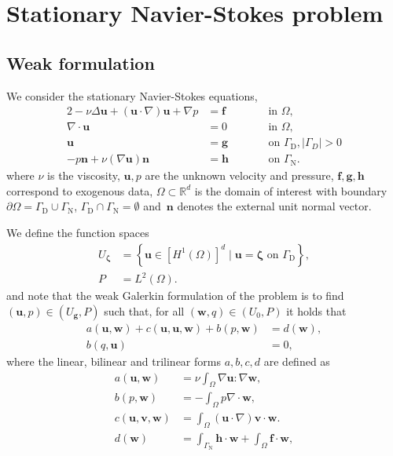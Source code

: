 \documentclass[onecolumn, twoside, a4paper, 11pt]{article}
\begin{document}
\section{Stationary Navier-Stokes problem}

\subsection{Weak formulation}
\label{sec:setting}
We consider the stationary Navier-Stokes equations,
\begin{alignat}{2}
  \label{eqn:ns-1}
  -\nu \Delta \bm u + (\bm u \cdot \nabla) \bm u + \nabla p &= \bm f && \qquad \text{in } \Omega, \\
  \label{eqn:ns-2}
  \nabla \cdot \bm u &= 0 && \qquad \text{in } \Omega, \\
  \label{eqn:ns-3}
  \bm u &= \bm g && \qquad \text{on } \Gamma_\text{D}, |\Gamma_D| > 0 \\
  \label{eqn:ns-4}
  -p \bm n + \nu (\nabla \bm u) \bm n &= \bm h && \qquad \text{on } \Gamma_\text{N}.
\end{alignat}
where $\nu$ is the viscosity, $\bm u, p$ are the unknown velocity and pressure,
$\bm{f},\bm{g},\bm{h}$ correspond to exogenous data,
$\Omega \subset \mathbb R^d$ is the domain of interest with boundary
$\partial \Omega = \Gamma_\text{D} \cup \Gamma_\text{N}$, $\Gamma_\text{D} \cap \Gamma_\text{N} = \emptyset$
and~$\bm{n}$ denotes the external unit normal vector.

We define the function spaces
\begin{align}
  U_{\bm{\zeta}} &= \left\{ \bm u \in [H^1(\Omega)]^d \;|\; \bm u = \bm \zeta \text{ on } \Gamma_\text{D} \right\}, \\
  P &= L^2(\Omega).
\end{align}
%
and note that the weak Galerkin formulation of the problem is to find
%
$(\bm u, p) \in (U_{\bm g}, P)$ such that, for all $(\bm w, q) \in (U_0, P)$ it holds
that
\begin{align}
  a(\bm u, \bm w) + c(\bm u, \bm u, \bm w) + b(p, \bm w) &= d(\bm w), \label{eqn:var-1} \\
  b(q, \bm u) &= 0, \label{eqn:var-2}
\end{align}
%
where the linear, bilinear and trilinear forms $a,b,c,d$ are defined as
%
\begin{subequations}
\begin{align}
  a(\bm u, \bm w) &= \nu \int_\Omega \nabla \bm u : \nabla \bm w, \label{eqn:form-3} \\
  b(p, \bm w) &= -\int_\Omega p \nabla \cdot \bm w, \label{eqn:form-2} \\
  c(\bm u, \bm v, \bm w) &= \int_\Omega (\bm u \cdot \nabla) \bm v \cdot \bm w. \label{eqn:form-4}\\
  d(\bm w) &= \int_{\Gamma_\text{N}} \bm h \cdot \bm w + \int_{\Omega} \bm f \cdot \bm w, \label{eqn:form-1}
\end{align}
\end{subequations}
\end{document}
